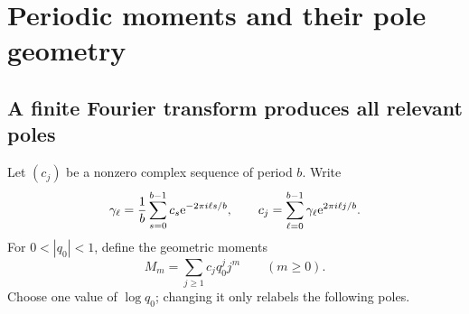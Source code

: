 \documentclass[11pt,a4paper]{article}
\numberwithin{equation}{section}
\theoremstyle{definition}\newtheorem{definition}[theorem]{Definition}
\theoremstyle{remark}\newtheorem{remark}[theorem]{Remark}
\theoremstyle{definition}
\begin{document}
\section{Periodic moments and their pole geometry}
\label{sec:moments}
\subsection{A finite Fourier transform produces all relevant poles}
Let $(c_j)$ be a nonzero complex sequence of period $b$. Write
\begin{equation}
 \gamma_\ell=\frac1b\sum_{s=0}^{b-1}c_s\mathrm e^{-2\pi i\ell s/b},
 \qquad c_j=\sum_{\ell=0}^{b-1}\gamma_\ell\mathrm e^{2\pi i\ell j/b}.
 \label{eq:DFT}
\end{equation}
For $0<|q_0|<1$, define the geometric moments
\begin{equation}
 M_m=\sum_{j\ge1}c_jq_0^j j^m\qquad(m\ge0).
 \label{eq:moments}
\end{equation}
Choose one value of $\log q_0$; changing it only relabels the following poles.
\end{document}
